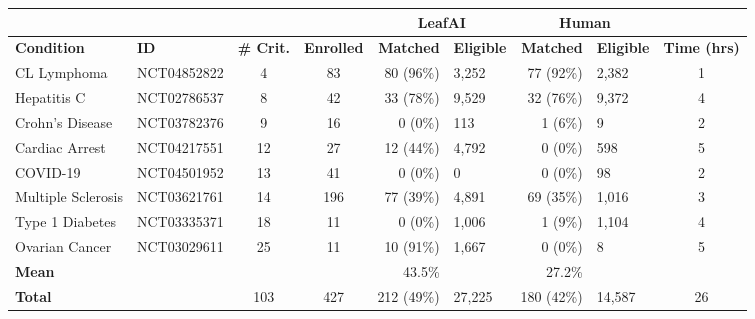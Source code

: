\def\arraystretch{1.4}
\begin{tabular}{l l c c |r l |r l |c}
     & & & & \multicolumn{2}{c}{\textbf{LeafAI}} & \multicolumn{2}{|c}{\textbf{Human}}  \\
     \toprule
    \textbf{Condition} & \textbf{ID} & \textbf{\# Crit.} & \textbf{Enrolled} & \textbf{Matched} & \textbf{Eligible} & \textbf{Matched} & \textbf{Eligible} & \textbf{Time (hrs)} \\
    \midrule
    CL Lymphoma        & \footnotesize{NCT04852822} & 4 & 83 & 80 (96\%) & 3,252 & 77 (92\%) & 2,382 & 1 \\
    Hepatitis C        & \footnotesize{NCT02786537} & 8 & 42 & 33 (78\%) & 9,529 & 32 (76\%) & 9,372 & 4 \\
    Crohn's Disease    & \footnotesize{NCT03782376} & 9 & 16 & 0 (0\%) & 113 & 1 (6\%) & 9 & 2 \\
    Cardiac Arrest     & \footnotesize{NCT04217551} & 12 & 27 & 12 (44\%) & 4,792 & 0 (0\%) & 598 & 5 \\
    COVID-19           & \footnotesize{NCT04501952} & 13 & 41 & 0 (0\%) & 0 & 0 (0\%) & 98 & 2 \\
    Multiple Sclerosis & \footnotesize{NCT03621761} & 14 & 196 & 77 (39\%) & 4,891 & 69 (35\%) & 1,016 & 3 \\
    Type 1 Diabetes    & \footnotesize{NCT03335371} & 18 & 11  & 0 (0\%) & 1,006 & 1 (9\%) & 1,104 & 4 \\
    Ovarian Cancer     & \footnotesize{NCT03029611} & 25 & 11 & 10 (91\%) & 1,667 & 0 (0\%) & 8 & 5 \\
    \bottomrule
    \textbf{Mean} & & & & 43.5\% & & 27.2\% & \\
    \textbf{Total} & & 103 & 427 & 212 (49\%) & 27,225 & 180 (42\%) & 14,587 & 26  \\
\end{tabular}